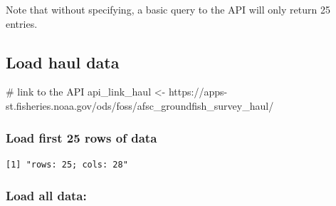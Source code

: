 \documentclass[
  letterpaper,
  oneside,
  open=any]{scrbook}
\newenvironment{Shaded}{\begin{snugshade}}{\end{snugshade}}
\newcommand{\AttributeTok}[1]{\textcolor[rgb]{0.40,0.45,0.13}{#1}}
\newcommand{\CommentTok}[1]{\textcolor[rgb]{0.37,0.37,0.37}{#1}}
\newcommand{\DocumentationTok}[1]{\textcolor[rgb]{0.37,0.37,0.37}{\textit{#1}}}
\newcommand{\FunctionTok}[1]{\textcolor[rgb]{0.28,0.35,0.67}{#1}}
\newcommand{\NormalTok}[1]{\textcolor[rgb]{0.00,0.23,0.31}{#1}}
\newcommand{\OtherTok}[1]{\textcolor[rgb]{0.00,0.23,0.31}{#1}}
\newcommand{\SpecialCharTok}[1]{\textcolor[rgb]{0.37,0.37,0.37}{#1}}
\newcommand{\StringTok}[1]{\textcolor[rgb]{0.13,0.47,0.30}{#1}}
\begin{document}
Note that without specifying, a basic query to the API will only return
25 entries.

\subsection{Load haul data}\label{load-haul-data}

\begin{Shaded}
\begin{Highlighting}[]
\CommentTok{\# link to the API}
\NormalTok{api\_link\_haul }\OtherTok{\textless{}{-}} \StringTok{\textquotesingle{}https://apps{-}st.fisheries.noaa.gov/ods/foss/afsc\_groundfish\_survey\_haul/\textquotesingle{}}
\end{Highlighting}
\end{Shaded}

\subsubsection{Load first 25 rows of
data}\label{load-first-25-rows-of-data}

\begin{Shaded}
\end{Shaded}

\begin{verbatim}
[1] "rows: 25; cols: 28"
\end{verbatim}

\subsubsection{Load all data:}\label{load-all-data}
\end{document}
